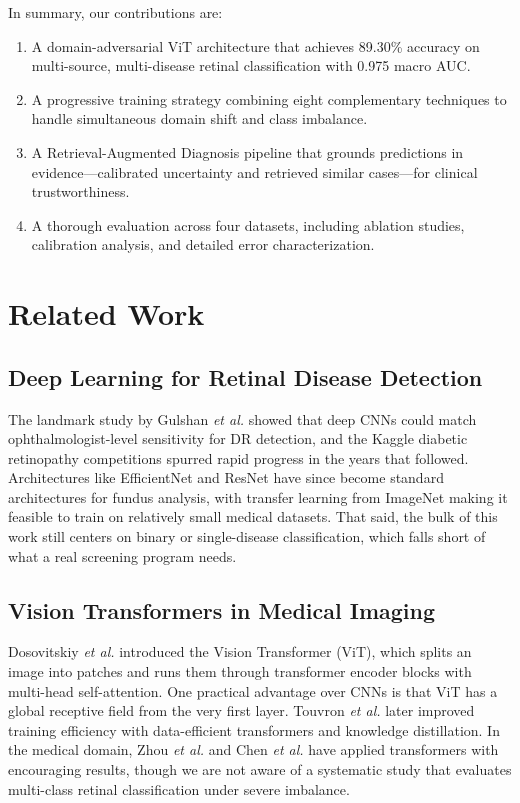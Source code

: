 \documentclass[conference]{IEEEtran}
\begin{document}
In summary, our contributions are:
\begin{enumerate}
    \item A domain-adversarial ViT architecture that achieves 89.30\% accuracy on multi-source, multi-disease retinal classification with 0.975 macro AUC.
    \item A progressive training strategy combining eight complementary techniques to handle simultaneous domain shift and class imbalance.
    \item A Retrieval-Augmented Diagnosis pipeline that grounds predictions in evidence---calibrated uncertainty and retrieved similar cases---for clinical trustworthiness.
    \item A thorough evaluation across four datasets, including ablation studies, calibration analysis, and detailed error characterization.
\end{enumerate}

\section{Related Work}

\subsection{Deep Learning for Retinal Disease Detection}

The landmark study by Gulshan \textit{et al.} \cite{b3} showed that deep CNNs could match ophthalmologist-level sensitivity for DR detection, and the Kaggle diabetic retinopathy competitions \cite{b29} spurred rapid progress in the years that followed. Architectures like EfficientNet \cite{b5} and ResNet \cite{b6} have since become standard architectures for fundus analysis, with transfer learning from ImageNet making it feasible to train on relatively small medical datasets. That said, the bulk of this work still centers on binary or single-disease classification, which falls short of what a real screening program needs.

\subsection{Vision Transformers in Medical Imaging}

Dosovitskiy \textit{et al.} \cite{b8} introduced the Vision Transformer (ViT), which splits an image into patches and runs them through transformer encoder blocks with multi-head self-attention. One practical advantage over CNNs is that ViT has a global receptive field from the very first layer. Touvron \textit{et al.} \cite{b28} later improved training efficiency with data-efficient transformers and knowledge distillation. In the medical domain, Zhou \textit{et al.} \cite{b14} and Chen \textit{et al.} \cite{b15} have applied transformers with encouraging results, though we are not aware of a systematic study that evaluates multi-class retinal classification under severe imbalance.
\end{document}
